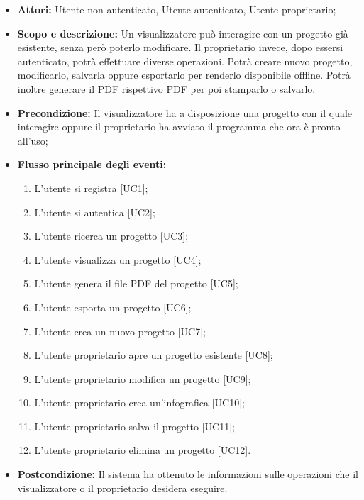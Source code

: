 \begin{itemize}
	\item \textbf{Attori:} Utente non autenticato, Utente autenticato, Utente proprietario;
	
	\item \textbf{Scopo e descrizione:} Un visualizzatore può interagire con un progetto già esistente, senza però poterlo modificare. Il proprietario invece, dopo essersi autenticato, potrà effettuare diverse operazioni. Potrà creare nuovo progetto, modificarlo, salvarla oppure esportarlo per renderlo disponibile offline. Potrà inoltre generare il PDF rispettivo PDF per poi stamparlo o salvarlo.
	
	\item \textbf{Precondizione:} Il visualizzatore ha a disposizione una progetto con il quale interagire oppure il proprietario ha avviato il programma che ora è pronto all'uso;
	
	\item \textbf{Flusso principale degli eventi:}
	\begin{enumerate}
		\item L'utente si registra [UC1];
		\item L'utente si autentica [UC2];
		\item L'utente ricerca un progetto [UC3];
		\item L'utente visualizza un progetto [UC4];
		\item L'utente genera il file PDF del progetto [UC5];
		\item L'utente esporta un progetto [UC6];
		\item L'utente crea un nuovo progetto [UC7];
		\item L'utente proprietario apre un progetto esistente [UC8];
		\item L'utente proprietario modifica un progetto [UC9];
		\item L'utente proprietario crea un'infografica [UC10];
		\item L'utente proprietario salva il progetto [UC11];
		\item L'utente proprietario elimina un progetto [UC12].
	\end{enumerate}
	
	\item \textbf{Postcondizione:} Il sistema ha ottenuto le informazioni sulle operazioni che il visualizzatore o il proprietario desidera eseguire.
\end{itemize}

\newpage

